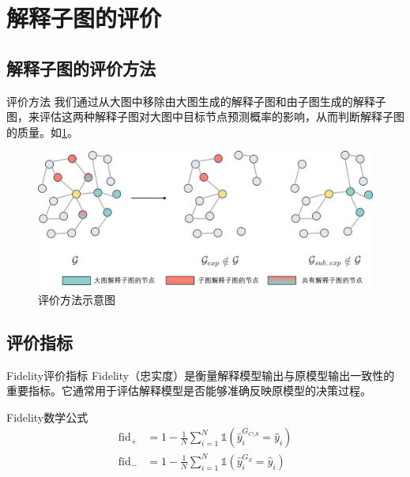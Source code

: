 \documentclass[UTF8, aspectratio=169,10pt]{beamer}%
\numberwithin{equation}{section}
\numberwithin{figure}{section}
\numberwithin{table}{section}
\theoremstyle{definition}
\begin{document}
\section{解释子图的评价}
\subsection{解释子图的评价方法}
\begin{frame}{评价方法}
	我们通过从大图中移除由大图生成的解释子图和由子图生成的解释子图，来评估这两种解释子图对大图中目标节点预测概率的影响，从而判断解释子图的质量。如\cref{fig:99}。
	
	\begin{figure}[htpb]
		\centering
		\includegraphics[width=0.8\linewidth]{pic/q3}
		\caption{评价方法示意图}
		\label{fig:99}
	\end{figure}
	

\end{frame}

\subsection{评价指标}

\begin{frame}{Fidelity评价指标}
	Fidelity（忠实度）是衡量解释模型输出与原模型输出一致性的重要指标。它通常用于评估解释模型是否能够准确反映原模型的决策过程。
\begin{block}{Fidelity数学公式}
	\begin{equation}
		\begin{aligned}
			\mathrm{fid}_{+} &= 1 - \frac{1}{N} \sum_{i=1}^N \mathbb{1}(\hat{y}_i^{G_{C\setminus S}} = \hat{y}_i) \\
			\mathrm{fid}_{-} &= 1 - \frac{1}{N} \sum_{i=1}^N \mathbb{1}(\hat{y}_i^{G_S} = \hat{y}_i)
		\end{aligned}
	\end{equation}
\end{block}

\end{frame}
\end{document}
